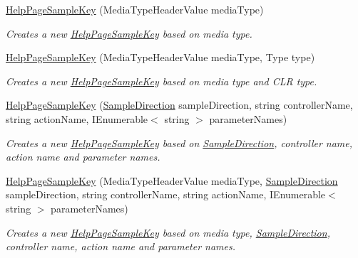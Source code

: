 \begin{DoxyCompactItemize}
\item 
\hyperlink{class_wis_r_rest_a_p_i_1_1_areas_1_1_help_page_1_1_help_page_sample_key_a880b56042845e2d2940eae112e734258}{Help\+Page\+Sample\+Key} (Media\+Type\+Header\+Value media\+Type)
\begin{DoxyCompactList}\small\item\em Creates a new \hyperlink{class_wis_r_rest_a_p_i_1_1_areas_1_1_help_page_1_1_help_page_sample_key}{Help\+Page\+Sample\+Key} based on media type. \end{DoxyCompactList}\item 
\hyperlink{class_wis_r_rest_a_p_i_1_1_areas_1_1_help_page_1_1_help_page_sample_key_a94f5a6378f8e934a41c481faa6e6f72f}{Help\+Page\+Sample\+Key} (Media\+Type\+Header\+Value media\+Type, Type type)
\begin{DoxyCompactList}\small\item\em Creates a new \hyperlink{class_wis_r_rest_a_p_i_1_1_areas_1_1_help_page_1_1_help_page_sample_key}{Help\+Page\+Sample\+Key} based on media type and C\+L\+R type. \end{DoxyCompactList}\item 
\hyperlink{class_wis_r_rest_a_p_i_1_1_areas_1_1_help_page_1_1_help_page_sample_key_a3e2df264ba5f10e730f387f88a642f5c}{Help\+Page\+Sample\+Key} (\hyperlink{namespace_wis_r_rest_a_p_i_1_1_areas_1_1_help_page_a5e9118cc1fa882599364690b402f67c7}{Sample\+Direction} sample\+Direction, string controller\+Name, string action\+Name, I\+Enumerable$<$ string $>$ parameter\+Names)
\begin{DoxyCompactList}\small\item\em Creates a new \hyperlink{class_wis_r_rest_a_p_i_1_1_areas_1_1_help_page_1_1_help_page_sample_key}{Help\+Page\+Sample\+Key} based on \hyperlink{class_wis_r_rest_a_p_i_1_1_areas_1_1_help_page_1_1_help_page_sample_key_a00e600712288edbcdf0a2930704b7534}{Sample\+Direction}, controller name, action name and parameter names. \end{DoxyCompactList}\item 
\hyperlink{class_wis_r_rest_a_p_i_1_1_areas_1_1_help_page_1_1_help_page_sample_key_a9215dde912bc83acf1da91cdad9b162a}{Help\+Page\+Sample\+Key} (Media\+Type\+Header\+Value media\+Type, \hyperlink{namespace_wis_r_rest_a_p_i_1_1_areas_1_1_help_page_a5e9118cc1fa882599364690b402f67c7}{Sample\+Direction} sample\+Direction, string controller\+Name, string action\+Name, I\+Enumerable$<$ string $>$ parameter\+Names)
\begin{DoxyCompactList}\small\item\em Creates a new \hyperlink{class_wis_r_rest_a_p_i_1_1_areas_1_1_help_page_1_1_help_page_sample_key}{Help\+Page\+Sample\+Key} based on media type, \hyperlink{class_wis_r_rest_a_p_i_1_1_areas_1_1_help_page_1_1_help_page_sample_key_a00e600712288edbcdf0a2930704b7534}{Sample\+Direction}, controller name, action name and parameter names. \end{DoxyCompactList}\item 

\end{DoxyCompactItemize}
